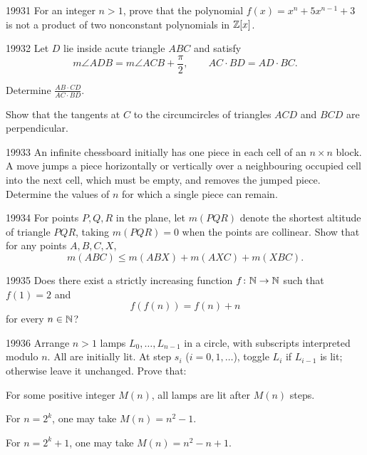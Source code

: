 
\begin{problem}{1993}{1}
For an integer $n>1$, prove that the polynomial $f(x)=x^n+5x^{n-1}+3$ is not a product of two nonconstant polynomials in $\mathbb{Z}[x]$.
\end{problem}

\begin{problem}{1993}{2}
Let $D$ lie inside acute triangle $ABC$ and satisfy
\[
    m\angle ADB=m\angle ACB+\frac{\pi}{2},\qquad AC\cdot BD=AD\cdot BC.
\]
\begin{problemsubparts}
    \item Determine $\displaystyle\frac{AB\cdot CD}{AC\cdot BD}$.
    \item Show that the tangents at $C$ to the circumcircles of triangles $ACD$ and $BCD$ are perpendicular.
\end{problemsubparts}
\end{problem}

\begin{problem}{1993}{3}
An infinite chessboard initially has one piece in each cell of an $n\times n$ block. A move jumps a piece horizontally or vertically over a neighbouring occupied cell into the next cell, which must be empty, and removes the jumped piece. Determine the values of $n$ for which a single piece can remain.
\end{problem}

\begin{problem}{1993}{4}
For points $P, Q, R$ in the plane, let $m(PQR)$ denote the shortest altitude of triangle $PQR$, taking $m(PQR)=0$ when the points are collinear. Show that for any points $A, B, C, X$,
\[
    m(ABC)\leq m(ABX)+m(AXC)+m(XBC).
\]
\end{problem}

\begin{problem}{1993}{5}
Does there exist a strictly increasing function $f\colon\mathbb{N}\to\mathbb{N}$ such that $f(1)=2$ and
\[
    f(f(n))=f(n)+n
\]
for every $n\in\mathbb{N}$?
\end{problem}

\begin{problem}{1993}{6}
Arrange $n>1$ lamps $L_0, \dots, L_{n-1}$ in a circle, with subscripts interpreted modulo $n$. All are initially lit. At step $s_i$ ($i=0, 1, \dots$), toggle $L_i$ if $L_{i-1}$ is lit; otherwise leave it unchanged. Prove that:
\begin{problemsubparts}
    \item For some positive integer $M(n)$, all lamps are lit after $M(n)$ steps.
    \item For $n=2^k$, one may take $M(n)=n^2-1$.
    \item For $n=2^k+1$, one may take $M(n)=n^2-n+1$.
\end{problemsubparts}
\end{problem}

